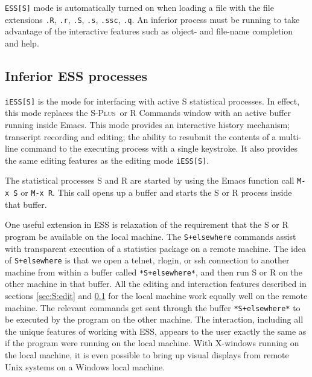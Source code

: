 \documentclass{article}
\newcommand*{\Splus}{\textsc{S-Plus}}
\newcommand{\stexttt}[1]{{\small\texttt{#1}}}
\begin{document}
\stexttt{ESS[S]} mode is automatically turned on when loading a file with the
file extensions \stexttt{.R}, \stexttt{.r},
\stexttt{.S}, \stexttt{.s}, \stexttt{.ssc}, \stexttt{.q}.  An inferior
process must be running to take advantage of the interactive features
such as object- and file-name completion and help.

\subsection{Inferior ESS processes}
\label{sec:S:inf}

\stexttt{iESS[S]} is the mode for interfacing with active S
statistical processes.  In effect, this mode replaces the \Splus\ or R
Commands window with an active buffer running inside Emacs.  This mode
provides an interactive history mechanism; transcript recording and
editing; the ability to resubmit the contents of a multi-line command
to the executing process with a single keystroke.  It also provides
the same editing features as the editing mode \stexttt{iESS[S]}.

The statistical processes S and R are started by using the Emacs function call
\stexttt{M-x~S} or \stexttt{M-x~R}.  This call opens up a buffer and starts the
S or R process inside that buffer.

One useful extension in ESS is relaxation of the requirement that the
S or R program be available on the local machine.  The
\stexttt{S+elsewhere} commands assist with
transparent execution of a statistics package on a remote machine.
The idea of \stexttt{S+elsewhere} is that we open a telnet, rlogin, or
ssh connection to another machine from within a buffer called
\stexttt{*S+elsewhere*}, and then run S or R on the other machine in
that buffer.  All the editing and interaction features described in sections
\ref{sec:S:edit} and \ref{sec:S:inf} for the local machine
work equally well on the remote machine.  The relevant commands
get sent through the buffer
\stexttt{*S+elsewhere*} to be executed by the program on the other
machine.  The interaction, including all the unique
features of working with ESS, appears to the user exactly the same as if the
program were running on the local machine.  With X-windows running on the
local machine, it is even possible to
bring up visual displays from remote Unix systems on a Windows local machine.
\end{document}
